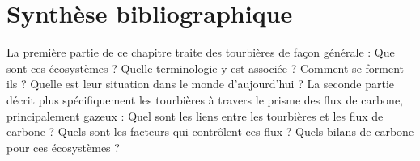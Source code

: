 
%	
%

\singlespacing
\chapter{Synth\`{e}se bibliographique}

\minitoc

\newpage
\doublespacing
{}
La première partie de ce chapitre traite des tourbières de façon générale : Que sont ces écosystèmes ?
Quelle terminologie y est associée ? Comment se forment-ils ? Quelle est leur situation dans le monde d'aujourd'hui ?
La seconde partie décrit plus spécifiquement les tourbières à travers le prisme des flux de carbone, principalement gazeux : 
Quel sont les liens entre les tourbières et les flux de carbone ? 
Quels sont les facteurs qui contrôlent ces flux ? 
Quels bilans de carbone pour ces écosystèmes ?

